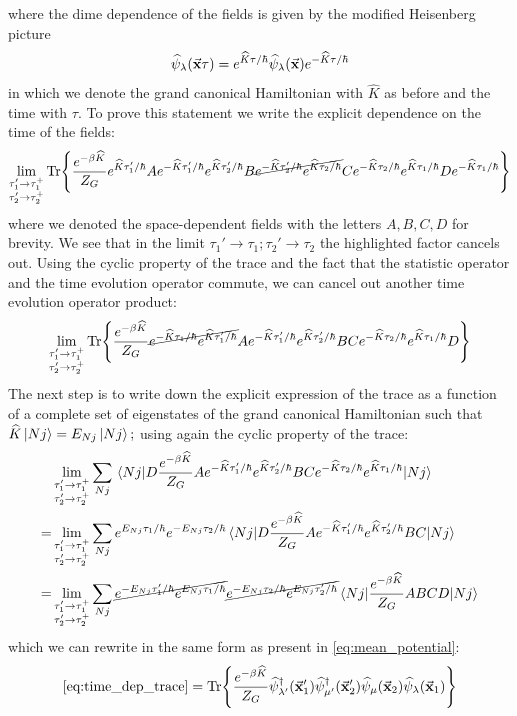 \documentclass[a4paper]{article}
\renewcommand{\hat}{\widehat}
\newcommand{\stanis}{\frac{e^{-\beta\hat{K}}}{Z_G}}
\newcommand{\lisa}{\lim_{\substack{\tau_1'\rightarrow\tau_1^+\\\tau_2'\rightarrow\tau_2^+}}}
\begin{document}
where the dime dependence of the fields is given by the modified Heisenberg picture
\begin{equation}
\hat{\psi}_{\lambda}(\va{x}\tau) = e^{\hat{K}\tau/\hbar}\hat{\psi}_{\lambda}(\va{x})e^{-\hat{K}\tau/\hbar}
\end{equation}
in which we denote the grand canonical Hamiltonian with $\hat{K}$ as before and the time with $\tau.$
To prove this statement we write the explicit dependence on the time of the fields:
\begin{equation}
\lisa\Tr{\stanis e^{\hat{K}\tau_1'/\hbar}A e^{-\hat{K}\tau_1'/\hbar}e^{\hat{K}\tau_2'/\hbar}B \cancel{e^{-\hat{K}\tau_2'/\hbar}e^{\hat{K}\tau_2/\hbar}} C e^{-\hat{K}\tau_2/\hbar} e^{\hat{K}\tau_1/\hbar}D e^{-\hat{K}\tau_1/\hbar}}
\end{equation}
where we denoted the space-dependent fields with the letters $A,B,C,D$ for brevity.
We see that in the limit $\tau_1'\rightarrow\tau_1; \tau_2'\rightarrow\tau_2$ the highlighted factor cancels out.
Using the cyclic property of the trace and the fact that the statistic operator and the time evolution operator commute, we can cancel out another time evolution operator product:
\begin{equation}
\lisa\Tr{\stanis \cancel{e^{-\hat{K}\tau_1/\hbar} e^{\hat{K}\tau_1'/\hbar}}A e^{-\hat{K}\tau_1'/\hbar}e^{\hat{K}\tau_2'/\hbar}B  C e^{-\hat{K}\tau_2/\hbar} e^{\hat{K}\tau_1/\hbar}D }
\end{equation}
The next step is to write down the explicit expression of the trace as a function of a complete set of eigenstates of the grand canonical Hamiltonian such that $\hat{K}\ket{Nj} = E_{Nj}\ket{Nj};$ using again the cyclic property of the trace:
\begin{align}
&\lisa \sum_{Nj} \ev{D \stanis A e^{-\hat{K}\tau_1'/\hbar}e^{\hat{K}\tau_2'/\hbar}B  C e^{-\hat{K}\tau_2/\hbar} e^{\hat{K}\tau_1/\hbar}}{Nj}\\
=& \lisa \sum_{Nj} e^{E_{Nj}\tau_1/\hbar} e^{-E_{Nj}\tau_2/\hbar} \ev{D \stanis A e^{-\hat{K}\tau_1'/\hbar}e^{\hat{K}\tau_2'/\hbar}B  C }{Nj}\\
=& \lisa \sum_{Nj} \cancel{e^{-E_{Nj}\tau_1'/\hbar} e^{E_{Nj}\tau_1/\hbar}}\cancel{e^{-E_{Nj}\tau_2/\hbar} e^{E_{Nj}\tau_2'/\hbar}}\ev{\stanis A B  C  D}{Nj}
\end{align}
which we can rewrite in the same form as present in \eqref{eq:mean_potential}:
\begin{equation}
\eqref{eq:time_dep_trace}=\Tr{\frac{e^{-\beta\hat{K}}}{Z_G}\hat{\psi}^\dag_{\lambda'}(\va{x}_1')\hat{\psi}^\dag_{\mu'}(\va{x}_2')\hat{\psi}_\mu(\va{x}_2)\hat{\psi}_\lambda(\va{x}_1)}
\end{equation}
\end{document}
